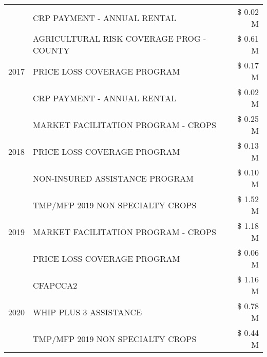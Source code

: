 \begin{tabular}{llr}
 & CRP PAYMENT - ANNUAL RENTAL & \$ 0.02 M \\
\cline{1-3}
\multirow[t]{3}{*}{2017} & AGRICULTURAL RISK COVERAGE PROG - COUNTY & \$ 0.61 M \\
 & PRICE LOSS COVERAGE PROGRAM & \$ 0.17 M \\
 & CRP PAYMENT - ANNUAL RENTAL & \$ 0.02 M \\
\cline{1-3}
\multirow[t]{3}{*}{2018} & MARKET FACILITATION PROGRAM - CROPS & \$ 0.25 M \\
 & PRICE LOSS COVERAGE PROGRAM & \$ 0.13 M \\
 & NON-INSURED ASSISTANCE PROGRAM & \$ 0.10 M \\
\cline{1-3}
\multirow[t]{3}{*}{2019} & TMP/MFP 2019 NON SPECIALTY CROPS & \$ 1.52 M \\
 & MARKET FACILITATION PROGRAM - CROPS & \$ 1.18 M \\
 & PRICE LOSS COVERAGE PROGRAM & \$ 0.06 M \\
\cline{1-3}
\multirow[t]{3}{*}{2020} & CFAPCCA2 & \$ 1.16 M \\
 & WHIP PLUS 3 ASSISTANCE & \$ 0.78 M \\
 & TMP/MFP 2019 NON SPECIALTY CROPS & \$ 0.44 M \\
\cline{1-3}
\bottomrule
\end{tabular}
